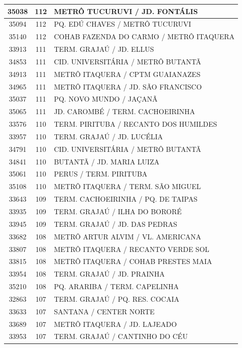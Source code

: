 \documentclass[
	12pt,				%
	oneside,			%
	a4paper,			%
	english,			%
	brazil				%
	]{abntex2ppgsi}
\begin{document}
{{\begin{apendicesenv}
\begin{longtable}{c|c|p{7cm}}
 \hline 
35038 &	112 &	METRÔ TUCURUVI / JD. FONTÁLIS \\ 
 \hline 
35094 &	112 &	PQ. EDÚ CHAVES / METRÔ TUCURUVI \\ 
 \hline 
35140 &	112 &	COHAB FAZENDA DO CARMO / METRÔ ITAQUERA \\ 
 \hline 
33913 &	111 &	TERM. GRAJAÚ / JD. ELLUS \\ 
 \hline 
34853 &	111 &	CID. UNIVERSITÁRIA / METRÔ BUTANTÃ \\ 
 \hline 
34913 &	111 &	METRÔ ITAQUERA / CPTM GUAIANAZES \\ 
 \hline 
34965 &	111 &	METRÔ ITAQUERA / JD. SÃO FRANCISCO \\ 
 \hline 
35037 &	111 &	PQ. NOVO MUNDO / JAÇANÃ \\ 
 \hline 
35065 &	111 &	JD. CAROMBÉ / TERM. CACHOEIRINHA \\ 
 \hline 
33576 &	110 &	TERM. PIRITUBA / RECANTO DOS HUMILDES \\ 
 \hline 
33957 &	110 &	TERM. GRAJAÚ / JD. LUCÉLIA \\ 
 \hline 
34791 &	110 &	CID. UNIVERSITÁRIA / METRÔ BUTANTÃ \\ 
 \hline 
34841 &	110 &	BUTANTÃ / JD. MARIA LUIZA \\ 
 \hline 
35061 &	110 &	PERUS / TERM. PIRITUBA \\ 
 \hline 
35108 &	110 &	METRÔ ITAQUERA / TERM. SÃO MIGUEL \\ 
 \hline 
33643 &	109 &	TERM. CACHOEIRINHA / PQ. DE TAIPAS \\ 
 \hline 
33935 &	109 &	TERM. GRAJAÚ / ILHA DO BORORÉ \\ 
 \hline 
33945 &	109 &	TERM. GRAJAÚ / JD. DAS PEDRAS \\ 
 \hline 
33682 &	108 &	METRÔ ARTUR ALVIM / VL. AMERICANA \\ 
 \hline 
33807 &	108 &	METRÔ ITAQUERA / RECANTO VERDE SOL \\ 
 \hline 
33815 &	108 &	METRÔ ITAQUERA / COHAB PRESTES MAIA \\ 
 \hline 
33954 &	108 &	TERM. GRAJAÚ / JD. PRAINHA \\ 
 \hline 
35210 &	108 &	PQ. ARARIBA / TERM. CAPELINHA \\ 
 \hline 
32863 &	107 &	TERM. GRAJAÚ / PQ. RES. COCAIA \\ 
 \hline 
33633 &	107 &	SANTANA / CENTER NORTE \\ 
 \hline 
33689 &	107 &	METRÔ ITAQUERA / JD. LAJEADO \\ 
 \hline 
33953 &	107 &	TERM. GRAJAÚ / CANTINHO DO CÉU \\ 

\end{longtable}
\end{apendicesenv}}}
\end{document}
